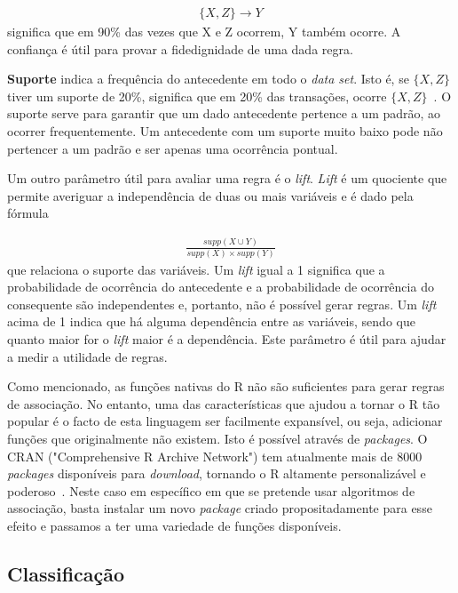 \begin{align*}
\{X, Z\} \rightarrow Y  
\end{align*}
significa que em 90\% das vezes que X e Z ocorrem, Y também ocorre. A confiança é útil para provar a fidedignidade de uma dada regra.

\textbf{Suporte} indica a frequência do antecedente em todo o \textit{data set}. Isto é, se $ \{X, Z\} $ tiver um suporte de 20\%, significa que em 20\% das transações, ocorre $\{X, Z\}$~\cite{oracle}. O suporte serve para garantir que um dado antecedente pertence a um padrão, ao ocorrer frequentemente. Um antecedente com um suporte muito baixo pode não pertencer a um padrão e ser apenas uma ocorrência pontual.

Um outro parâmetro útil para avaliar uma regra é o \textit{lift}. \textit{Lift} é um quociente que permite averiguar a independência de duas ou mais variáveis e é dado pela fórmula 

\begin{align*}
\frac{supp(X\cup Y)}{supp(X)\times supp(Y)}
\end{align*}
que relaciona o suporte das variáveis. Um \textit{lift} igual a 1 significa que a probabilidade de ocorrência do antecedente e a probabilidade de ocorrência do consequente são independentes e, portanto, não é possível gerar regras. Um \textit{lift} acima de 1 indica que há alguma dependência entre as variáveis, sendo que quanto maior for o \textit{lift} maior é a dependência. Este parâmetro é útil para ajudar a medir a utilidade de regras.\newline


Como mencionado, as funções nativas do R não são suficientes para gerar regras de associação. No entanto, uma das características que ajudou a tornar o R tão popular é o facto de esta linguagem ser facilmente expansível, ou seja, adicionar funções que originalmente não existem. Isto é possível através de \textit{packages}.
O CRAN ("Comprehensive R Archive Network") tem atualmente mais de 8000 \textit{packages} disponíveis para \textit{download}, tornando o R altamente personalizável e poderoso~\cite{cran}.
Neste caso em específico em que se pretende usar algoritmos de associação, basta instalar um novo \textit{package} criado propositadamente para esse efeito e passamos a ter uma variedade de funções disponíveis. 

\subsection{Classificação}

